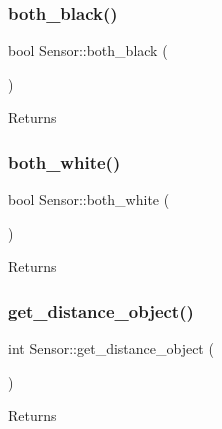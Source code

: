 \subsubsection{\texorpdfstring{both\+\_\+black()}{both\_black()}}
{\footnotesize\ttfamily bool Sensor\+::both\+\_\+black (\begin{DoxyParamCaption}{ }\end{DoxyParamCaption})}

\begin{DoxyReturn}{Returns}

\end{DoxyReturn}
\mbox{\label{class_sensor_add2279da6d407ed7678064ab1fe7d02d}} 
\subsubsection{\texorpdfstring{both\+\_\+white()}{both\_white()}}
{\footnotesize\ttfamily bool Sensor\+::both\+\_\+white (\begin{DoxyParamCaption}{ }\end{DoxyParamCaption})}

\begin{DoxyReturn}{Returns}

\end{DoxyReturn}
\mbox{\label{class_sensor_a118f38dcb8a695ad78b7c7d94f508d4f}} 
\subsubsection{\texorpdfstring{get\+\_\+distance\+\_\+object()}{get\_distance\_object()}}
{\footnotesize\ttfamily int Sensor\+::get\+\_\+distance\+\_\+object (\begin{DoxyParamCaption}{ }\end{DoxyParamCaption})}

\begin{DoxyReturn}{Returns}

\end{DoxyReturn}
\mbox{\label{class_sensor_a7065fe2dff6107b89d162e59271a9491}} 
